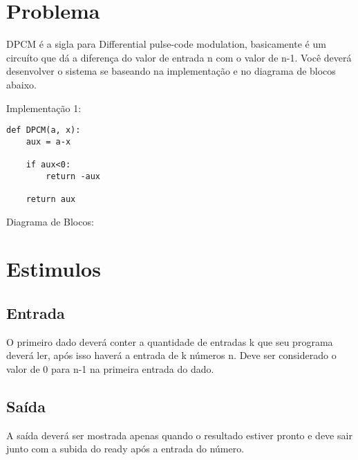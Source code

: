 \documentclass[
    12pt,
    a4paper,
    oneside,
    chapter=TITLE,
    section=TITLE,
    subsection=TITLE,
    subsubsection=TITLE,
    english,
    french,
    spanish,
    brazil,
    ]{abntex2}
\begin{document}
\frenchspacing 
\imprimircapa
\imprimirfolhaderosto

\tableofcontents*
\cleardoublepage

\textual

\chapter{Problema}
DPCM é a sigla para Differential pulse-code modulation, basicamente é um circuíto que dá a diferença do valor de entrada n com o valor de n-1. Você deverá desenvolver o sistema se baseando na implementação e no diagrama de blocos abaixo.

\par
Implementação 1:
\begin{lstlisting}
def DPCM(a, x):
    aux = a-x

    if aux<0:
        return -aux

    return aux
\end{lstlisting}

\par
Diagrama de Blocos:




\chapter{Estimulos}
\section{Entrada}
O primeiro dado deverá conter a quantidade de entradas k que seu programa deverá ler, após isso haverá a entrada de k números n. Deve ser considerado o valor de 0 para n-1 na primeira entrada do dado.
\section{Saída}
A saída deverá ser mostrada apenas quando o resultado estiver pronto e deve sair junto com a subida do ready após a entrada do número.
\end{document}
